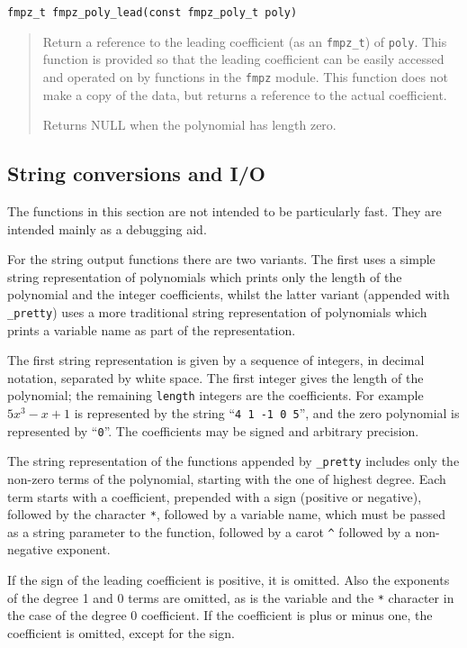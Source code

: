 \documentclass[a4paper,10pt]{article}
\newcommand{\code}{\lstinline}
\begin{document}
\begin{lstlisting}
fmpz_t fmpz_poly_lead(const fmpz_poly_t poly)
\end{lstlisting}
\begin{quote}
Return a reference to the leading coefficient (as an \code{fmpz_t}) of \code{poly}. This function is provided so that the leading coefficient can be easily accessed and operated on by functions in the \code{fmpz} module. This function does not make a copy of the data, but returns a reference to the actual coefficient.

Returns NULL when the polynomial has length zero. 
\end{quote}

\subsection{String conversions and I/O}

The functions in this section are not intended to be particularly fast. They are intended mainly as a debugging aid.

For the string output functions there are two variants. The first uses a simple string representation of polynomials which prints only the length of the polynomial and the integer coefficients, whilst the latter variant (appended with \code{_pretty}) uses a more traditional string representation of polynomials which prints a variable name as part of the representation. 

The first string representation is given by a sequence of integers, in decimal notation, separated by white space. The first integer gives the length of the polynomial; the remaining \code{length} integers are the coefficients. For example $5x^3 - x + 1$ is represented by the string ``\code{4 1 -1 0 5}'', and the zero polynomial is represented by ``\code{0}''. The coefficients may be signed and arbitrary precision.

The string representation of the functions appended by \code{_pretty} includes only the non-zero terms of the polynomial, starting with the one of highest degree. Each term starts with a coefficient, prepended with a sign (positive or negative), followed by the character \code{*}, followed by a variable name, which must be passed as a string parameter to the function, followed by a carot \code{^} followed by a non-negative exponent.

If the sign of the leading coefficient is positive, it is omitted. Also the exponents of the degree 1 and 0 terms are omitted, as is the variable and the \code{*} character in the case of the degree 0 coefficient. If the coefficient is plus or minus one, the coefficient is omitted, except for the sign.
\end{document}
